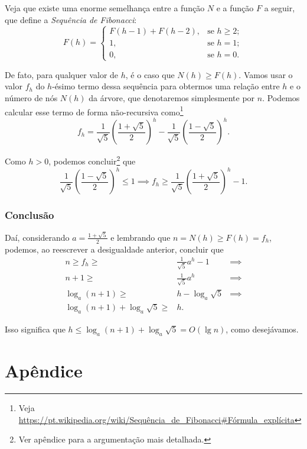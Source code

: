 \documentclass[10pt,a4paper,twoside]{article}
\theoremstyle{definition}
\begin{document}
Veja que existe uma enorme semelhança entre a função \( N \) e a função \( F \) a seguir, que define a \emph{Sequência de Fibonacci}: \[ F(h) = \begin{cases}
    F(h-1) + F(h-2) , & \text{se } h \geq 2; \\
    1               , & \text{se } h = 1; \\
    0               , & \text{se } h = 0.
\end{cases} \]

De fato, para qualquer valor de \( h \), é o caso que \( N(h) \geq F(h) \). Vamos usar o valor \( f_h \) do \( h \)-ésimo termo dessa sequência para obtermos uma relação entre \( h \) e o número de nós \( N(h) \) da árvore, que denotaremos simplesmente por \( n \). Podemos calcular esse termo de forma não-recursiva como\footnote{Veja \url{https://pt.wikipedia.org/wiki/Sequência_de_Fibonacci\#Fórmula_explícita}} \[ f_h = \frac{1}{\sqrt{5}}\left( \frac{1 + \sqrt{5}}{2} \right)^h - \frac{1}{\sqrt{5}}\left( \frac{1 - \sqrt{5}}{2} \right)^h. \]

Como \( h > 0 \), podemos concluir\footnote{Ver apêndice para a argumentação mais detalhada.} que \[ \frac{1}{\sqrt{5}}\left( \frac{1 - \sqrt{5}}{2} \right)^h \leq 1 \implies f_h \geq \frac{1}{\sqrt{5}}\left( \frac{1 + \sqrt{5}}{2} \right)^h - 1. \]

\section{Conclusão}
Daí, considerando \( a = \frac{1 + \sqrt{5}}{2} \) e lembrando que \( n = N(h) \geq F(h) = f_h \), podemos, ao reescrever a desigualdade anterior, concluir que
\begin{eqnarray*} 
	n \geq f_h \geq& \displaystyle\frac{1}{\sqrt{5}} a^h - 1 & \implies \\
	n + 1 \geq& \displaystyle\frac{1}{\sqrt{5}} a^h & \implies \\
	\log_a (n + 1) \geq& h - \log_a \sqrt{5} & \implies \\
	\log_a (n + 1) + \log_a \sqrt{5} \geq& h.
\end{eqnarray*}

Isso significa que \( h \leq \log_a (n + 1) + \log_a \sqrt{5} = O(\lg n) \), como desejávamos.

\part*{Apêndice}
\end{document}
